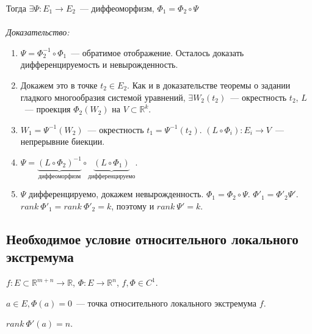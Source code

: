 \documentclass[paper=a4, fontsize=11pt]{article}
\begin{document}
Тогда $\exists \Psi: E_1 \rightarrow E_2$~--- диффеоморфизм, $\Phi_1 = \Phi_2 \circ \Psi$
\\\\
\emph{Доказательство:}
\begin{enumerate}
    \item $\Psi = \Phi_2^{-1} \circ \Phi_1$~--- обратимое отображение. Осталось доказать дифференцируемость и невырожденность.
    \item Докажем это в точке $t_2 \in E_2$. Как и в доказательстве теоремы о задании гладкого многообразия системой уравнений,
    $\exists W_2(t_2)$~--- окрестность $t_2$, $L$~--- проекция $\Phi_2(W_2)$ на $V \subset \mathds{R}^k$.
    \item $W_1 = \Psi^{-1}(W_2)$~--- окрестность $t_1=\Psi^{-1}(t_2)$. $(L \circ \Phi_i):E_i \rightarrow V$~--- непрерывние биекции.
    \item $\Psi = \underbrace{(L \circ \Phi_2)^{-1}}_{\text{диффеоморфизм}} \circ
    \underbrace{(L \circ \Phi_1)}_{\text{дифференцируемо}}$.
    \item $\Psi$ дифференцируемо, докажем невырожденность. $\Phi_1 = \Phi_2 \circ \Psi$. $\Phi'_1 = \Phi'_2 \Psi'$.
    $rank\ \Phi'_1 = rank\ \Phi'_2 = k$, поэтому и $rank\ \Psi' = k$.
\end{enumerate}

\subsection{Необходимое условие относительного локального экстремума}
$f: E \subset \mathds{R}^{m+n} \rightarrow \mathds{R}$, $\Phi: E \rightarrow \mathds{R}^n$, $f, \Phi \in C^1$.

$a \in E, \Phi(a) = 0$~--- точка относительного локального экстремума $f$.

$rank\ \Phi'(a) = n$.
\end{document}
